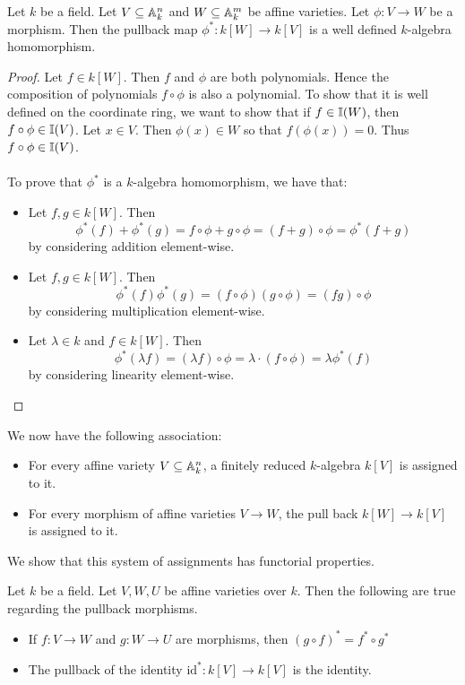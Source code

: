 \documentclass[a4paper]{article}
\begin{document}
\begin{lmm}{}{} Let $k$ be a field. Let $V\subseteq\mathbb{A}_k^n$ and $W\subseteq\mathbb{A}_k^m$ be affine varieties. Let $\phi:V\to W$ be a morphism. Then the pullback map $\phi^\ast:k[W]\to k[V]$ is a well defined $k$-algebra homomorphism. \tcbline
\begin{proof}
Let $f\in k[W]$. Then $f$ and $\phi$ are both polynomials. Hence the composition of polynomials $f\circ\phi$ is also a polynomial. To show that it is well defined on the coordinate ring, we want to show that if $f\in\mathbb{I}(W)$, then $f\circ\phi\in\mathbb{I}(V)$. Let $x\in V$. Then $\phi(x)\in W$ so that $f(\phi(x))=0$. Thus $f\circ\phi\in\mathbb{I}(V)$. \\~\\

To prove that $\phi^\ast$ is a $k$-algebra homomorphism, we have that: 
\begin{itemize}
\item Let $f,g\in k[W]$. Then $$\phi^\ast(f)+\phi^\ast(g)=f\circ\phi+g\circ\phi=(f+g)\circ\phi=\phi^\ast(f+g)$$ by considering addition element-wise. 
\item Let $f,g\in k[W]$. Then $$\phi^\ast(f)\phi^\ast(g)=(f\circ\phi)(g\circ\phi)=(fg)\circ\phi$$ by considering multiplication element-wise. 
\item Let $\lambda\in k$ and $f\in k[W]$. Then $$\phi^\ast(\lambda f)=(\lambda f)\circ\phi=\lambda\cdot(f\circ\phi)=\lambda\phi^\ast(f)$$ by considering linearity element-wise. 
\end{itemize}
\end{proof}
\end{lmm}

We now have the following association:
\begin{itemize}
\item For every affine variety $V\subseteq\mathbb{A}_k^n$, a finitely reduced $k$-algebra $k[V]$ is assigned to it. 
\item For every morphism of affine varieties $V\to W$, the pull back $k[W]\to k[V]$ is assigned to it. 
\end{itemize}
We show that this system of assignments has functorial properties. 

\begin{prp}{}{} Let $k$ be a field. Let $V,W,U$ be affine varieties over $k$. Then the following are true regarding the pullback morphisms. 
\begin{itemize}
\item If $f:V\to W$ and $g:W\to U$ are morphisms, then $(g\circ f)^\ast=f^\ast\circ g^\ast$
\item The pullback of the identity $\text{id}^\ast:k[V]\to k[V]$ is the identity. 
\end{itemize}
\end{prp}
\end{document}
